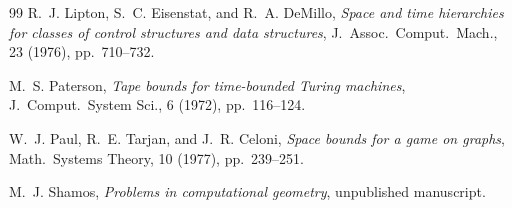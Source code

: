 \documentclass[12pt]{article}
\theoremstyle{remark}
\begin{document}
\begin{thebibliography}{99}
R.~J. Lipton, S.~C. Eisenstat, and R.~A. DeMillo, \textit{Space and time
hierarchies for classes of control structures and data structures}, J.\ Assoc.\
Comput.\ Mach., 23 (1976), pp.~710--732.

M.~S. Paterson, \textit{Tape bounds for time-bounded Turing machines}, J.\ Comput.\
System Sci., 6 (1972), pp.~116--124.

W.~J. Paul, R.~E. Tarjan, and J.~R. Celoni, \textit{Space bounds for a game on
graphs}, Math.\ Systems Theory, 10 (1977), pp.~239--251.

M.~J. Shamos, \textit{Problems in computational geometry}, unpublished manuscript.

\end{thebibliography}
\end{document}
